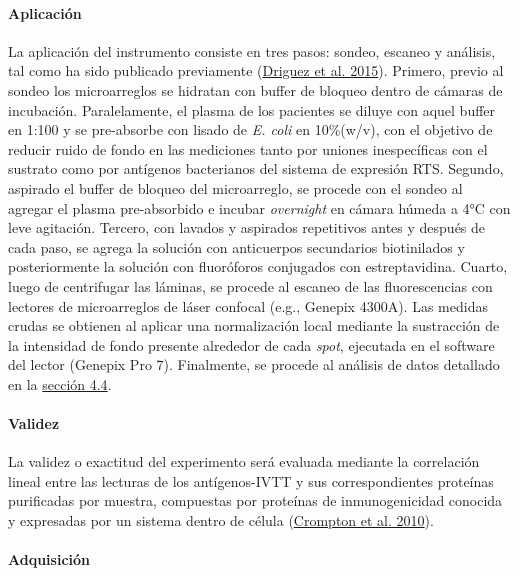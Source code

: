 \documentclass[
  a4paper]{article}
\begin{document}
\hypertarget{aplicaciuxf3n}{%
\paragraph{Aplicación}\label{aplicaciuxf3n}}

La aplicación del instrumento consiste en tres pasos: sondeo, escaneo y
análisis, tal como ha sido publicado previamente
(\protect\hyperlink{ref-Driguez2015}{Driguez et al. 2015}). Primero,
previo al sondeo los microarreglos se hidratan con buffer de bloqueo
dentro de cámaras de incubación. Paralelamente, el plasma de los
pacientes se diluye con aquel buffer en 1:100 y se pre-absorbe con
lisado de \emph{E. coli} en 10\%(w/v), con el objetivo de reducir ruido
de fondo en las mediciones tanto por uniones inespecíficas con el
sustrato como por antígenos bacterianos del sistema de expresión RTS.
Segundo, aspirado el buffer de bloqueo del microarreglo, se procede con
el sondeo al agregar el plasma pre-absorbido e incubar \emph{overnight}
en cámara húmeda a 4°C con leve agitación. Tercero, con lavados y
aspirados repetitivos antes y después de cada paso, se agrega la
solución con anticuerpos secundarios biotinilados y posteriormente la
solución con fluoróforos conjugados con estreptavidina. Cuarto, luego de
centrifugar las láminas, se procede al escaneo de las fluorescencias con
lectores de microarreglos de láser confocal (e.g., Genepix 4300A). Las
medidas crudas se obtienen al aplicar una normalización local mediante
la sustracción de la intensidad de fondo presente alrededor de cada
\emph{spot}, ejecutada en el software del lector (Genepix Pro 7).
Finalmente, se procede al análisis de datos detallado en la
\protect\hyperlink{anadata}{sección 4.4}.

\hypertarget{validez}{%
\paragraph{Validez}\label{validez}}

La validez o exactitud del experimento será evaluada mediante la
correlación lineal entre las lecturas de los antígenos-IVTT y sus
correspondientes proteínas purificadas por muestra, compuestas por
proteínas de inmunogenicidad conocida y expresadas por un sistema dentro
de célula (\protect\hyperlink{ref-crompton2010}{Crompton et al. 2010}).

\hypertarget{adquisiciuxf3n}{%
\paragraph{Adquisición}\label{adquisiciuxf3n}}
\end{document}
